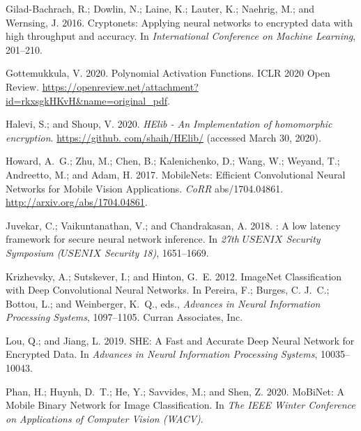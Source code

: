 \documentclass[letterpaper]{article} %
\begin{document}
\begin{thebibliography}{25}
Gilad-Bachrach, R.; Dowlin, N.; Laine, K.; Lauter, K.; Naehrig, M.; and
  Wernsing, J. 2016.
\newblock Cryptonets: Applying neural networks to encrypted data with high
  throughput and accuracy.
\newblock In \emph{International Conference on Machine Learning}, 201--210.

Gottemukkula, V. 2020.
\newblock Polynomial Activation Functions.
\newblock ICLR 2020 Open Review.
\newblock
  \url{https://openreview.net/attachment?id=rkxsgkHKvH&name=original_pdf}.

Halevi, S.; and Shoup, V. 2020.
\newblock \emph{{HElib} - An Implementation of homomorphic encryption}.
\newblock \url{https://github. com/shaih/HElib/} (accessed March 30, 2020).

Howard, A.~G.; Zhu, M.; Chen, B.; Kalenichenko, D.; Wang, W.; Weyand, T.;
  Andreetto, M.; and Adam, H. 2017.
\newblock MobileNets: Efficient Convolutional Neural Networks for Mobile Vision
  Applications.
\newblock \emph{CoRR} abs/1704.04861.
\newblock \urlprefix\url{http://arxiv.org/abs/1704.04861}.

Juvekar, C.; Vaikuntanathan, V.; and Chandrakasan, A. 2018.
: A low latency framework for secure neural network
  inference.
\newblock In \emph{27th $USENIX$ Security Symposium ($USENIX$ Security 18)},
  1651--1669.

Krizhevsky, A.; Sutskever, I.; and Hinton, G.~E. 2012.
\newblock ImageNet Classification with Deep Convolutional Neural Networks.
\newblock In Pereira, F.; Burges, C. J.~C.; Bottou, L.; and Weinberger, K.~Q.,
  eds., \emph{Advances in Neural Information Processing Systems}, 1097--1105.
  Curran Associates, Inc.

Lou, Q.; and Jiang, L. 2019.
\newblock SHE: A Fast and Accurate Deep Neural Network for Encrypted Data.
\newblock In \emph{Advances in Neural Information Processing Systems},
  10035--10043.

Phan, H.; Huynh, D.~T.; He, Y.; Savvides, M.; and Shen, Z. 2020.
\newblock MoBiNet: A Mobile Binary Network for Image Classification.
\newblock In \emph{The IEEE Winter Conference on Applications of Computer
  Vision (WACV)}.


\end{thebibliography}
\end{document}
